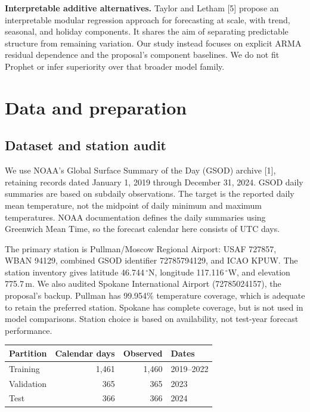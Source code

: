 \documentclass{article}
\begin{document}
\textbf{Interpretable additive alternatives.} Taylor and Letham [5] propose
an interpretable modular regression approach for forecasting at scale, with
trend, seasonal, and holiday components. It shares the aim of separating
predictable structure from remaining variation. Our study instead focuses
on explicit ARMA residual dependence and the proposal's component baselines.
We do not fit Prophet or infer superiority over that broader model family.

\newpage
\section{Data and preparation}
\subsection{Dataset and station audit}
We use NOAA's Global Surface Summary of the Day (GSOD) archive [1], retaining
records dated January 1, 2019 through December 31, 2024. GSOD daily summaries
are based on subdaily observations. The target is the reported daily mean
temperature, not the midpoint of daily minimum and maximum temperatures.
NOAA documentation defines the daily summaries using Greenwich Mean Time,
so the forecast calendar here consists of UTC days.

The primary station is Pullman/Moscow Regional Airport: USAF 727857, WBAN
94129, combined GSOD identifier 72785794129, and ICAO KPUW. The station
inventory gives latitude 46.744\,$^\circ$N, longitude 117.116\,$^\circ$W, and
elevation 775.7\,m. We also audited Spokane International Airport
(72785024157), the proposal's backup. Pullman has 99.954\% temperature coverage,
which is adequate to retain the preferred station. Spokane has complete coverage,
but is not used in model comparisons. Station choice is based on availability,
not test-year forecast performance.

\begin{center}
\begin{tabular}{lrrl}
\toprule
Partition & Calendar days & Observed & Dates\\
\midrule
Training & 1,461 & 1,460 & 2019--2022\\
Validation & 365 & 365 & 2023\\
Test & 366 & 366 & 2024\\
\bottomrule
\end{tabular}
\end{center}
\end{document}
